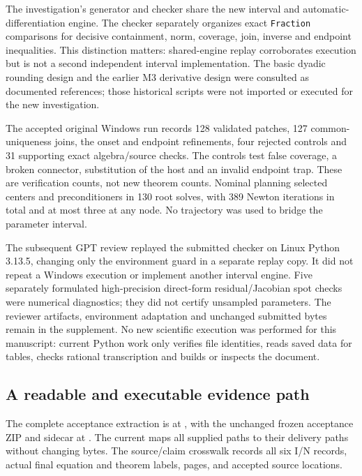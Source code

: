 \documentclass[11pt,a4paper]{article}
\numberwithin{equation}{section}
\begin{document}
The investigation's generator and checker share the new interval and automatic-differentiation engine. The checker separately organizes exact \texttt{Fraction} comparisons for decisive containment, norm, coverage, join, inverse and endpoint inequalities. This distinction matters: shared-engine replay corroborates execution but is not a second independent interval implementation. The basic dyadic rounding design and the earlier M3 derivative design were consulted as documented references; those historical scripts were not imported or executed for the new investigation.

The accepted original Windows run records 128 validated patches, 127 common-uniqueness joins, the onset and endpoint refinements, four rejected controls and 31 supporting exact algebra/source checks. The controls test false coverage, a broken connector, substitution of the host and an invalid endpoint trap. These are verification counts, not new theorem counts. Nominal planning selected centers and preconditioners in 130 root solves, with 389 Newton iterations in total and at most three at any node. No trajectory was used to bridge the parameter interval.

The subsequent GPT review replayed the submitted checker on Linux Python 3.13.5, changing only the environment guard in a separate replay copy. It did not repeat a Windows execution or implement another interval engine. Five separately formulated high-precision direct-form residual/Jacobian spot checks were numerical diagnostics; they did not certify unsampled parameters. The reviewer artifacts, environment adaptation and unchanged submitted bytes remain in the supplement. No new scientific execution was performed for this manuscript: current Python work only verifies file identities, reads saved data for tables, checks rational transcription and builds or inspects the document.

\subsection{A readable and executable evidence path}\label{sec:source-map}
The complete acceptance extraction is at , with the unchanged frozen acceptance ZIP and sidecar at . The current  maps all supplied paths to their delivery paths without changing bytes. The source/claim crosswalk records all six I/N records, actual final equation and theorem labels, pages, and accepted source locations.
\end{document}
